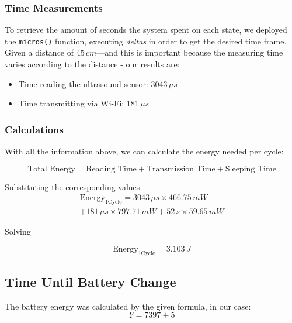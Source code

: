 \documentclass{article}
\begin{document}
\subsubsection{Time Measurements}

To retrieve the amount of seconds the system spent on each state, we deployed the \texttt{micros()} function, executing \textit{deltas} in order to get the desired time frame.
Given a distance of $45\,cm$---and this is important because the measuring time varies according to the distance - our results are:
\begin{itemize}
    \item Time reading the ultrasound sensor: 3043\,$\mu s$
    \item Time transmitting via Wi-Fi: 181\,$\mu s$
\end{itemize}

\subsubsection{Calculations}

With all the information above, we can calculate the energy needed per cycle:

\begin{equation}
\text{Total Energy} = \text{Reading Time} + \text{Transmission Time} + \text{Sleeping Time} 
\end{equation}

\noindent Substituting the corresponding values
\begin{equation}
    \begin{aligned}
    \text{Energy}_{\text{1Cycle}} = 3043\,\mu s \times 466.75\,mW \\+  181\,\mu s \times 797.71\,mW + 52\,s \times 59.65\,mW
    \end{aligned}
\end{equation}

\noindent Solving

\begin{equation}\label{energy1cycle}
    \text{Energy}_{\text{1Cycle}} = 3.103\,J
\end{equation}

\subsection{Time Until Battery Change}
The battery energy was calculated by the given formula, in our case:
\begin{equation}
    Y = 7397 + 5   
\end{equation}
\end{document}
